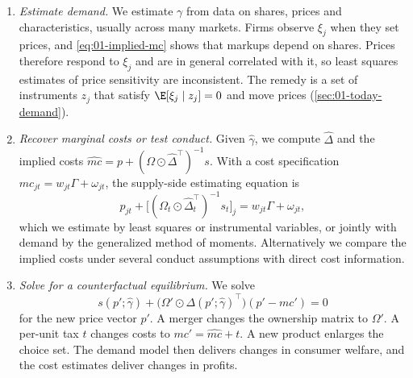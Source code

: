 \begin{enumerate}[label=\textit{Step \arabic*.}, leftmargin=*, itemsep=4pt]
  \item \textit{Estimate demand.} We estimate $\gamma$ from data on shares, prices and characteristics,
        usually across many markets. Firms observe $\xi_j$ when they set prices, and
        \eqref{eq:01-implied-mc} shows that markups depend on shares. Prices therefore respond to $\xi_j$
        and are in general correlated with it, so least squares estimates of price sensitivity are
        inconsistent. The remedy is a set of
        instruments $z_j$ that satisfy $\E[\xi_j \mid z_j] = 0$ and move prices
        (\cref{sec:01-today-demand}).
  \item \textit{Recover marginal costs or test conduct.} Given $\hat\gamma$, we compute $\hat\Delta$ and the
        implied costs $\widehat{mc} = p + (\Omega \odot \hat\Delta^\top)^{-1}s$. With a cost specification
        $mc_{jt} = w_{jt}\Gamma + \omega_{jt}$, the supply-side estimating equation is
        \begin{equation}\label{eq:01-supply-eq}
          p_{jt} + \big[(\Omega_t \odot \hat\Delta_t^\top)^{-1} s_t\big]_j = w_{jt}\Gamma + \omega_{jt},
        \end{equation}
        which we estimate by least squares or instrumental variables, or jointly with demand by the
        generalized method of moments. Alternatively we compare the implied costs under several conduct
        assumptions with direct cost information.
  \item \textit{Solve for a counterfactual equilibrium.} We solve
        \begin{equation}\label{eq:01-counterfactual}
          s(p'; \hat\gamma) + \big(\Omega' \odot \Delta(p'; \hat\gamma)^\top\big)(p' - mc') = 0
        \end{equation}
        for the new price vector $p'$. A merger changes the ownership matrix to $\Omega'$. A per-unit tax
        $t$ changes costs to $mc' = \widehat{mc} + t$. A new product enlarges the choice set. The demand
        model then delivers changes in consumer welfare, and the cost estimates deliver changes in profits.
\end{enumerate}

